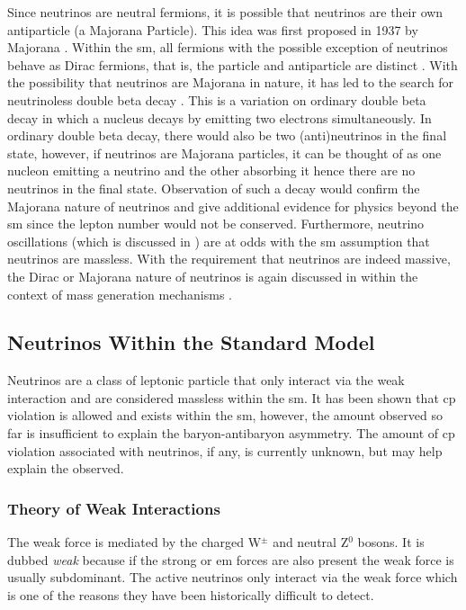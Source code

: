Since neutrinos are neutral fermions, it is possible that neutrinos are their own antiparticle (a Majorana Particle). This idea was first proposed in 1937 by Majorana \cite{Majorana2020}. Within the \Gls{sm}, all fermions with the possible exception of neutrinos behave as Dirac fermions, that is, the particle and antiparticle are distinct \cite{dirac_majorana_neutrinos}. With the possibility that neutrinos are Majorana in nature, it has led to the search for neutrinoless double beta decay \cite{Double_beta_decay}. This is a variation on ordinary double beta decay in which a nucleus decays by emitting two electrons simultaneously. In ordinary double beta decay, there would also be two (anti)neutrinos in the final state, however, if neutrinos are Majorana particles, it can be thought of as one nucleon emitting a neutrino and the other absorbing it hence there are no neutrinos in the final state. Observation of such a decay would confirm the Majorana nature of neutrinos and give additional evidence for physics beyond the \Gls{sm} since the lepton number would not be conserved. Furthermore, neutrino oscillations (which is discussed in ) are at odds with the \gls{sm} assumption that neutrinos are massless. With the requirement that neutrinos are indeed massive, the Dirac or Majorana nature of neutrinos is again discussed in  within the context of mass generation mechanisms \cite{The_physics_of_neutrinos_book}.

\subsection{Neutrinos Within the Standard Model}

Neutrinos are a class of leptonic particle that only interact via the weak interaction and are considered massless within the \gls{sm}. It has been shown that \gls{cp} violation is allowed and exists within the \gls{sm}, however, the amount observed so far is insufficient to explain the baryon-antibaryon asymmetry. The amount of \gls{cp} violation associated with neutrinos, if any, is currently unknown, but may help explain the observed. 

\subsubsection{Theory of Weak Interactions}\label{subsubsec:Theory of Weak Interactions}
The weak force is mediated by the charged W$^\pm$ and neutral Z$^0$ bosons. It is dubbed \textit{weak} because if the strong or \gls{em} forces are also present the weak force is usually subdominant. The active neutrinos only interact via the weak force which is one of the reasons they have been historically difficult to detect. 

